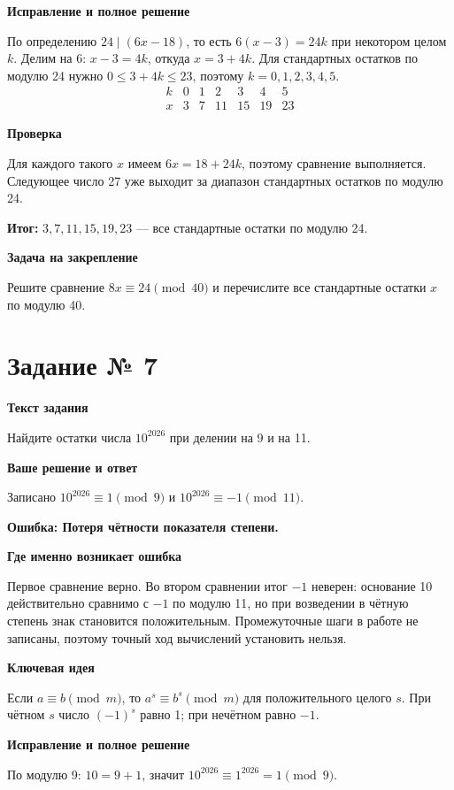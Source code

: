 \documentclass[a4paper,12pt]{article}
\newcommand{\block}[1]{\par\medskip\textbf{#1}\par\nopagebreak[3]}
\newcommand{\err}[1]{\block{\textcolor{red!75!black}{Ошибка:} #1}}
\newcommand{\idea}{\block{\textcolor{blue!60!black}{Ключевая идея}}}
\newcommand{\result}[1]{\par\textcolor{accent}{\textbf{Итог:}} #1}
\newcommand{\task}[1]{\clearpage\phantomsection\label{task:#1}\section*{\textcolor{accent}{Задание № #1}}}
\newcommand{\practice}{\block{Задача на закрепление}}
\begin{document}
\block{Исправление и полное решение}
По определению $24\mid(6x-18)$, то есть $6(x-3)=24k$ при некотором целом $k$. Делим на 6: $x-3=4k$, откуда $x=3+4k$. Для стандартных остатков по модулю 24 нужно $0\le3+4k\le23$, поэтому $k=0,1,2,3,4,5$.
\[
\begin{array}{c|rrrrrr}
k&0&1&2&3&4&5\\\hline
x&3&7&11&15&19&23
\end{array}
\]
\block{Проверка}
Для каждого такого $x$ имеем $6x=18+24k$, поэтому сравнение выполняется. Следующее число 27 уже выходит за диапазон стандартных остатков по модулю 24.
\result{$3,7,11,15,19,23$ --- все стандартные остатки по модулю 24.}
\practice
Решите сравнение $8x\equiv24\pmod{40}$ и перечислите все стандартные остатки $x$ по модулю 40.
\task{7}
\block{Текст задания}
Найдите остатки числа $10^{2026}$ при делении на 9 и на 11.
\block{Ваше решение и ответ}
Записано $10^{2026}\equiv1\pmod9$ и $10^{2026}\equiv-1\pmod{11}$.
\err{Потеря чётности показателя степени.}
\block{Где именно возникает ошибка}
Первое сравнение верно. Во втором сравнении итог $-1$ неверен: основание 10 действительно сравнимо с $-1$ по модулю 11, но при возведении в чётную степень знак становится положительным. Промежуточные шаги в работе не записаны, поэтому точный ход вычислений установить нельзя.
\idea
Если $a\equiv b\pmod m$, то $a^s\equiv b^s\pmod m$ для положительного целого $s$. При чётном $s$ число $(-1)^s$ равно 1; при нечётном равно $-1$.
\block{Исправление и полное решение}
По модулю 9: $10=9+1$, значит $10^{2026}\equiv1^{2026}=1\pmod9$.
\end{document}
